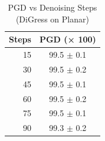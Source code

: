 \begin{table}
\centering
\caption{PGD vs Denoising Steps (DiGress on Planar)}
\begin{tabular}{rc}
\toprule
\textbf{Steps} & \textbf{PGD (× 100)} \\
\midrule
15 & 99.5 $\pm$ 0.1 \\
30 & 99.5 $\pm$ 0.2 \\
45 & 99.5 $\pm$ 0.1 \\
60 & 99.5 $\pm$ 0.2 \\
75 & 99.5 $\pm$ 0.1 \\
90 & 99.3 $\pm$ 0.2 \\
\bottomrule
\end{tabular}
\end{table}
